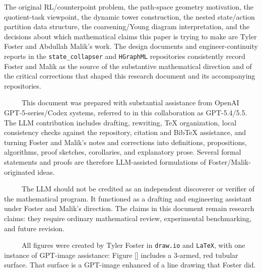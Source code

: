 \documentclass[11pt]{article}
\begin{document}
\begin{center}
\begin{minipage}{0.875\linewidth}
\small
{}
The original RL/counterpoint problem, the path-space geometry motivation, the quotient-task viewpoint, the dynamic tower construction, the nested state/action partition data structure, the coarsening/Young diagram interpretation, and the decisions about which mathematical claims this paper is trying to make are Tyler Foster and Abdullah Malik's work. The design documents and engineer-continuity reports in the \texttt{state\_collapser} and \texttt{HGraphML} repositories consistently record Foster and Malik as the source of the substantive mathematical direction and of the critical corrections that shaped this research document and its accompanying repositories.

\ \ \ \ \ This document was prepared with substantial assistance from OpenAI GPT-5-series/Codex systems, referred to in this collaboration as GPT-5.4/5.5. The LLM contribution includes drafting, rewriting, TeX organization, local consistency checks against the repository, citation and BibTeX assistance, and turning Foster and Malik's notes and corrections into definitions, propositions, algorithms, proof sketches, corollaries, and explanatory prose. Several formal statements and proofs are therefore LLM-assisted formulations of Foster/Malik-originated ideas.

\ \ \ \ \ The LLM should not be credited as an independent discoverer or verifier of the mathematical program. It functioned as a drafting and engineering assistant under Foster and Malik's direction. The claims in this document remain research claims: they require ordinary mathematical review, experimental benchmarking, and future revision.

\ \ \ \ \ All figures were created by Tyler Foster in \texttt{draw.io} and \texttt{LaTeX}, with one instance of GPT-image assistance: Figure \ref{} includes a $3$-armed, red tubular surface. That surface is a GPT-image enhanced of a line drawing that Foster did.
\end{minipage}
\end{center}
\newpage


\setcounter{tocdepth}{2}
\tableofcontents
\end{document}
